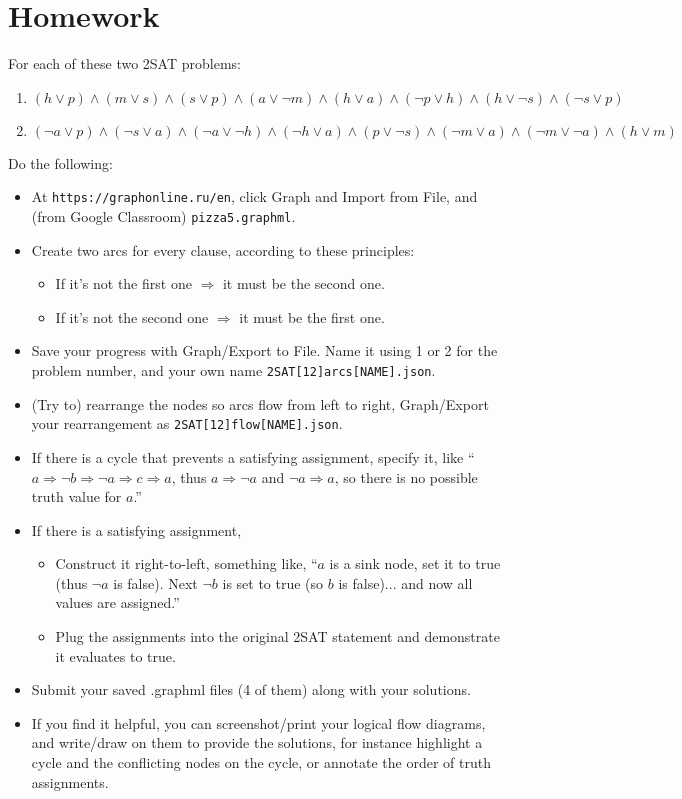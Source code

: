 \documentclass[12pt]{article}
\begin{document}
\clearpage
\section*{Homework}
For each of these two 2SAT problems:
\begin{enumerate}
\item
$(h \lor p) \land (m \lor s) \land (s \lor p) \land (a \lor \neg m)
  \land (h \lor a) \land (\neg p \lor h) \land (h \lor \neg s) \land
  (\neg s \lor p)$
\item
$(\neg a \lor p) \land (\neg s \lor a) \land (\neg a \lor \neg h) \land
  (\neg h \lor a) \land (p \lor \neg s) \land (\neg m \lor a) \land (\neg
  m \lor \neg a) \land (h \lor m)$
\end{enumerate}

Do the following:
\begin{itemize}
\item At {\tt https://graphonline.ru/en}, click Graph and Import from File, and (from
  Google Classroom) {\tt pizza5.graphml}.
\item Create two arcs for every clause, according to these principles:
  \begin{itemize}
  \item If it's not the first one $\Rightarrow$ it must be the second one.
  \item If it's not the second one $\Rightarrow$ it must be the first one.
  \end{itemize}
\item Save your progress with Graph/Export to File. Name it using 1 or 2 for
  the problem number, and your own name {\tt 2SAT[12]arcs[NAME].json}.
\item (Try to) rearrange the nodes so arcs flow from left to right, Graph/Export
  your rearrangement as {\tt 2SAT[12]flow[NAME].json}.
\item If there is a cycle that prevents a satisfying assignment, specify it,
  like ``$a \Rightarrow \neg b \Rightarrow \neg a \Rightarrow c \Rightarrow a$,
  thus $a\Rightarrow\neg a$ and $\neg a\Rightarrow a$, so there is no possible
  truth value for $a$.''
\item If there is a satisfying assignment,
  \begin{itemize}
    \item Construct it right-to-left, something like, ``$a$ is a sink node, set
      it to {\sc true} (thus $\neg a$ is {\sc false}). Next $\neg b$ is set to
      {\sc true} (so $b$ is {\sc false})... and now all values are assigned.''
    \item Plug the assignments into the original 2SAT statement and demonstrate
      it evaluates to {\sc true}.
  \end{itemize}

\item Submit your saved .graphml files (4 of them) along with your solutions.
\item If you find it helpful, you can screenshot/print your logical flow
  diagrams, and write/draw on them to provide the solutions, for instance
  highlight a cycle and the conflicting nodes on the cycle, or annotate the
  order of truth assignments.
\end{itemize}
\end{document}
